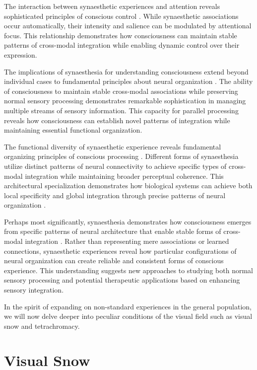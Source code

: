 \begin{refsection}
The interaction between synaesthetic experiences and attention reveals sophisticated principles of conscious control \cite{Mattingley2001}. While synaesthetic associations occur automatically, their intensity and salience can be modulated by attentional focus. This relationship demonstrates how consciousness can maintain stable patterns of cross-modal integration while enabling dynamic control over their expression.

The implications of synaesthesia for understanding consciousness extend beyond individual cases to fundamental principles about neural organization \cite{Ramachandran2001}. The ability of consciousness to maintain stable cross-modal associations while preserving normal sensory processing demonstrates remarkable sophistication in managing multiple streams of sensory information. This capacity for parallel processing reveals how consciousness can establish novel patterns of integration while maintaining essential functional organization.

The functional diversity of synaesthetic experience reveals fundamental organizing principles of conscious processing \cite{Grossenbacher2001}. Different forms of synaesthesia utilize distinct patterns of neural connectivity to achieve specific types of cross-modal integration while maintaining broader perceptual coherence. This architectural specialization demonstrates how biological systems can achieve both local specificity and global integration through precise patterns of neural organization \cite{Ward2013}.

Perhaps most significantly, synaesthesia demonstrates how consciousness emerges from specific patterns of neural architecture that enable stable forms of cross-modal integration \cite{Hubbard2005}. Rather than representing mere associations or learned connections, synaesthetic experiences reveal how particular configurations of neural organization can create reliable and consistent forms of conscious experience. This understanding suggests new approaches to studying both normal sensory processing and potential therapeutic applications based on enhancing sensory integration.

In the spirit of expanding on non-standard experiences in the general population, we will now delve deeper into peculiar conditions of the visual field such as visual snow and tetrachromacy.

\section{Visual Snow}


\end{refsection}
